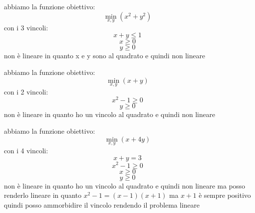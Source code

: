 \documentclass[a4paper,12pt, oneside]{book}
\begin{document}
\begin{esempio}
  abbiamo la funzione obiettivo:
  \[\min_{x,y}(x^2+y^2)\]
  con i 3 vincoli:
  \[x+y\leq 1\]
  \[x\geq 0\]
  \[y\geq 0\]
  non è lineare in quanto x e y sono al quadrato e quindi non lineare
\end{esempio}
\begin{esempio}
  abbiamo la funzione obiettivo:
  \[\min_{x,y}(x+y)\]
  con i 2 vincoli:
  \[x^2-1\geq 0\]
  \[y\geq 0\]
  non è lineare in quanto ho un vincolo al quadrato e quindi non
  lineare 
\end{esempio}
\begin{esempio}
  abbiamo la funzione obiettivo:
  \[\min_{x,y}(x+4y)\]
  con i 4 vincoli:
  \[x+y=3\]
  \[x^2-1\geq 0\]
  \[x\geq 0\]
  \[y\geq 0\]
  non è lineare in quanto ho un vincolo al quadrato e quindi non
  lineare ma posso renderlo lineare in quanto $x^2-1=(x-1)(x+1)$ ma
  $x+1$ è sempre positivo quindi posso ammorbidire il vincolo
  rendendo il problema lineare
\end{esempio}
\end{document}
